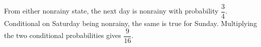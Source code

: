 From either nonrainy state, the next day is nonrainy with probability $\dfrac{3}{4}$. Conditional on Saturday being nonrainy, the same is true for Sunday. Multiplying the two conditional probabilities gives $\boxed{\dfrac{9}{16}}$.

